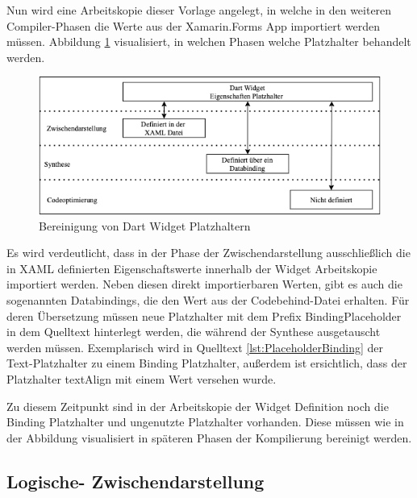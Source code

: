 Nun wird eine Arbeitskopie dieser Vorlage angelegt,  in welche in den weiteren Compiler-Phasen die Werte aus der Xamarin.Forms App importiert werden müssen. Abbildung \ref{fig:PlaceholderOptions} visualisiert, in welchen Phasen welche Platzhalter behandelt werden.

\newpage
\begin{figure}[!ht]
 \includegraphics[width=\textwidth,keepaspectratio]{Images/Implementation/DartPlaceHolder.png}
 \caption{Bereinigung von Dart Widget Platzhaltern}
 \label{fig:PlaceholderOptions}
\end{figure}
Es wird verdeutlicht, dass in der Phase der Zwischendarstellung ausschließlich die in XAML definierten Eigenschaftswerte innerhalb der Widget Arbeitskopie importiert werden.  Neben diesen direkt importierbaren Werten,  gibt es auch die sogenannten Databindings,  die den Wert aus der Codebehind-Datei erhalten.  Für deren Übersetzung müssen neue Platzhalter mit dem Prefix \glq BindingPlaceholder \grq in dem Quelltext hinterlegt werden,  die während der Synthese ausgetauscht werden müssen.  Exemplarisch wird in Quelltext  \ref{lst:PlaceholderBinding} der Text-Platzhalter zu einem Binding Platzhalter,  außerdem ist ersichtlich,  dass der Platzhalter textAlign mit einem Wert versehen wurde. 

 

Zu diesem Zeitpunkt sind in der Arbeitskopie der Widget Definition noch die Binding Platzhalter und ungenutzte Platzhalter vorhanden.  Diese müssen wie in der Abbildung visualisiert in späteren Phasen der Kompilierung bereinigt werden.

\subsection{Logische- Zwischendarstellung}

